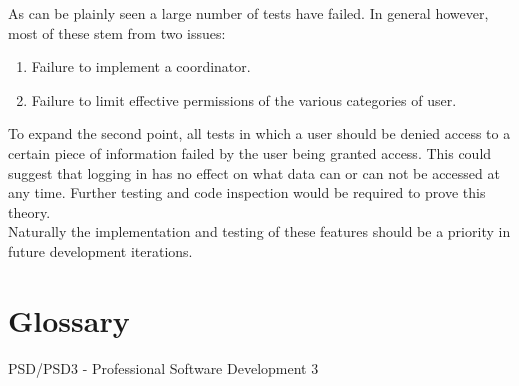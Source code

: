 \documentclass{l3deliverable}
\begin{document}
As can be plainly seen a large number of tests have failed. In general however, most of these stem from two issues:
\begin{enumerate}
\item{Failure to implement a coordinator.}
\item{Failure to limit effective permissions of the various categories of user.}
\end{enumerate}
To expand the second point, all tests in which a user should be denied access to a certain piece of information failed by the user being granted access. This could suggest that logging in has no effect on what data can or can not be accessed at any time. Further testing and code inspection would be required to prove this theory.\\
Naturally the implementation and testing of these features should be a priority in future development iterations.\\

\appendix

\section{Glossary}
PSD/PSD3 - Professional Software Development 3
\end{document}
